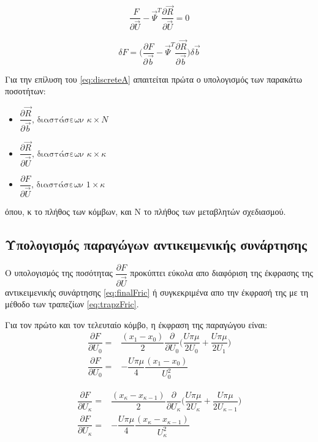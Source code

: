 \begin{equation}
\dfrac{\ F}{\partial \vec{U}}- \vec{\Psi}^T\dfrac{\partial \vec{R}}{\partial \vec{U}} = 0
\label{eq:discreteA}
\end{equation}

\begin{equation}
\delta F = \Big(\dfrac{\partial F}{\partial\vec{b}} - \vec{\Psi}^T\dfrac{\partial\vec{R}}{\partial\vec{b}}\Big)\delta\vec{b}
\label{eq:DAsens}
\end{equation}

Για την επίλυση του \ref{eq:discreteA} απαιτείται πρώτα ο υπολογισμός των παρακάτω ποσοτήτων:

\begin{itemize}
    \item $\dfrac{\partial \vec{R}}{\partial \vec{b}}\text{, διαστάσεων } \kappa \times N$
    \item $\dfrac{\partial \vec{R}}{\partial \vec{U}}\text{, διαστάσεων } \kappa \times \kappa$
    \item $\dfrac{\partial F}{\partial \vec{U}}\text{, διαστάσεων }  1 \times \kappa$
\end{itemize}

όπου, κ το πλήθος των κόμβων, και Ν το πλήθος των μεταβλητών σχεδιασμού.
\subsection{Υπολογισμός παραγώγων αντικειμενικής συνάρτησης}

Ο υπολογισμός της ποσότητας $\dfrac{\partial F}{\partial \vec{U}}$ προκύπτει εύκολα απο διαφόριση της έκφρασης της αντικειμενικής συνάρτησης \ref{eq:finalFric} ή συγκεκριμένα απο την έκφρασή της με τη μέθοδο των τραπεζίων \ref{eq:trapzFric}.

Για τον πρώτο και τον τελευταίο κόμβο, η έκφραση της παραγώγου είναι:
\begin{equation}
\begin{aligned}    
    \dfrac{\partial F}{\partial U_0} =& \dfrac{(x_1-x_0)}{2}\dfrac{\partial}{\partial U_0}\Bigg(\dfrac{U\pi\mu}{2U_0}+\dfrac{U\pi\mu}{2U_1}\Bigg)\\
    \dfrac{\partial F}{\partial U_0} =& -\dfrac{U\pi\mu}{4}\dfrac{(x_1-x_0)}{U_0^2}
\end{aligned}   
    \label{eq:pFU0}
\end{equation}

\begin{equation}
\begin{aligned}    
    \dfrac{\partial F}{\partial U_{\kappa}} =& \dfrac{(x_{\kappa}-x_{\kappa-1})}{2}\dfrac{\partial}{\partial U_{\kappa}}\Bigg(\dfrac{U\pi\mu}{2U_{\kappa}}+\dfrac{U\pi\mu}{2U_{\kappa-1}}\Bigg)\\
    \dfrac{\partial F}{\partial U_{\kappa}} =& -\dfrac{U\pi\mu}{4}\dfrac{(x_{\kappa}-x_{\kappa-1})}{U_{\kappa}^2}
\end{aligned}   
    \label{eq:pFUk}
\end{equation}


